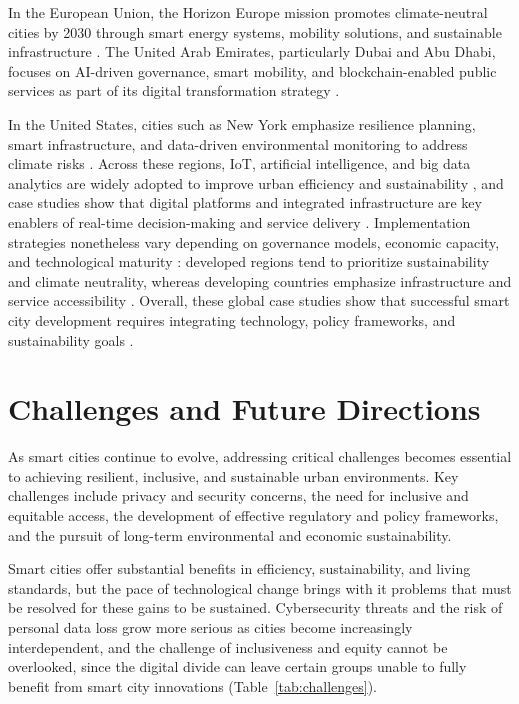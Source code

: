 \documentclass[journal]{IEEEtran}
\begin{document}
In the European Union, the Horizon Europe mission promotes climate-neutral cities by 2030 through smart energy systems, mobility solutions, and sustainable infrastructure \cite{r85}. The United Arab Emirates, particularly Dubai and Abu Dhabi, focuses on AI-driven governance, smart mobility, and blockchain-enabled public services as part of its digital transformation strategy \cite{r112}.

In the United States, cities such as New York emphasize resilience planning, smart infrastructure, and data-driven environmental monitoring to address climate risks \cite{r90,r113}. Across these regions, IoT, artificial intelligence, and big data analytics are widely adopted to improve urban efficiency and sustainability \cite{r4}, and case studies show that digital platforms and integrated infrastructure are key enablers of real-time decision-making and service delivery \cite{r106}. Implementation strategies nonetheless vary depending on governance models, economic capacity, and technological maturity \cite{r116}: developed regions tend to prioritize sustainability and climate neutrality, whereas developing countries emphasize infrastructure and service accessibility \cite{r101}. Overall, these global case studies show that successful smart city development requires integrating technology, policy frameworks, and sustainability goals \cite{r84}.

\section{Challenges and Future Directions}
As smart cities continue to evolve, addressing critical challenges becomes essential to achieving resilient, inclusive, and sustainable urban environments. Key challenges include privacy and security concerns, the need for inclusive and equitable access, the development of effective regulatory and policy frameworks, and the pursuit of long-term environmental and economic sustainability.

Smart cities offer substantial benefits in efficiency, sustainability, and living standards, but the pace of technological change brings with it problems that must be resolved for these gains to be sustained. Cybersecurity threats and the risk of personal data loss grow more serious as cities become increasingly interdependent, and the challenge of inclusiveness and equity cannot be overlooked, since the digital divide can leave certain groups unable to fully benefit from smart city innovations (Table~\ref{tab:challenges}).
\end{document}
